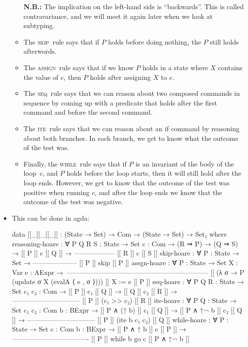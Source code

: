 \documentclass{lecturenotes}
\begin{document}
\begin{itemize}
\begin{itemize}
    \textbf{N.B.:} The implication on the left-hand side is ``backwards''.
    This is called contravariance, and we will meet it again later when we look at subtyping.
  \item The \textsc{skip}~rule says that if $P$ holds before doing nothing, the $P$ still holds afterwords.
  \item The \textsc{assign}~rule says that if we know $P$ holds in a state where $X$ contains the value of $e$, then $P$ holds after assigning $X$ to $e$.
  \item The \textsc{seq}~rule says that we can reason about two composed commands in sequence by coming up with a predicate that holds after the first command and before the second command.
  \item The \textsc{ite}~rule says that we can reason about an \textsf{if} command by reasoning about both branches.
    In each branch, we get to know what the outcome of the test was.
  \item Finally, the \textsc{while}~rule says that if $P$ is an invariant of the body of the loop~$c$, and $P$ holds before the loop starts, then it will still hold after the loop ends.
    However, we get to know that the outcome of the test was positive when running $c$, and after the loop ends we know that the outcome of the test was negative.
  \end{itemize}
  \pagebreak
\item This can be done in agda:
\begin{code}
data [[_]]_[[_]] : (State → Set) → Com → (State → Set) → Set₁ where
  reasoning-hoare : ∀ {P Q R S : State → Set} {c : Com} →
         (R ⇒ P) →
         (Q ⇒ S) →
    [[ P ]] c [[ Q ]] →
    ------------------
    [[ R ]] c [[ S ]]
  skip-hoare : ∀ {P : State → Set} →
    --------------------
    [[ P ]] skip [[ P ]]
  assgn-hoare : ∀ {P : State → Set} {X : Var} {e : AExpr} →
    ---------------------------------------------------------------
    [[ (λ σ → P (update σ X (evalA ⟨ e , σ ⟩))) ]] X := e [[ P ]]
  seq-hoare : ∀ {P Q R : State → Set} {c₁ c₂ : Com} →
        [[ P ]] c₁ [[ Q ]] →
        [[ Q ]] c₂ [[ R ]] →
    ------------------------------
    [[ P ]] (c₁ >> c₂) [[ R ]]
  ite-hoare : ∀ {P Q : State → Set} {c₁ c₂ : Com} {b : BExpr} →
    [[ P ∧ (↑ b) ]] c₁ [[ Q ]] →
    [[ P ∧ ↑¬ b ]] c₂ [[ Q ]] →
    ------------------------------
    [[ P ]] (ite b c₁ c₂) [[ Q ]]
  while-hoare : ∀ {P : State → Set} {c : Com} {b : BExpr} →
         [[ P ∧ ↑ b ]] c [[ P ]] →
    ----------------------------------
    [[ P ]] while b go c [[ P ∧ ↑¬ b ]]    

\end{code}
\end{itemize}
\end{document}
